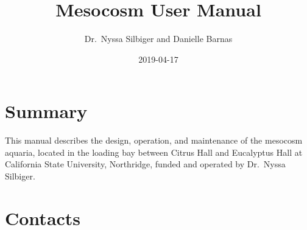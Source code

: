 \documentclass[]{book}
\title{Mesocosm User Manual}
\author{Dr.~Nyssa Silbiger and Danielle Barnas}
\date{2019-04-17}
\begin{document}
\maketitle

{
\setcounter{tocdepth}{1}
\tableofcontents
}
\chapter{Summary}\label{summary}

This manual describes the design, operation, and maintenance of the
mesocosm aquaria, located in the loading bay between Citrus Hall and
Eucalyptus Hall at California State University, Northridge, funded and
operated by Dr.~Nyssa Silbiger.

\chapter{Contacts}\label{contacts}
\end{document}
